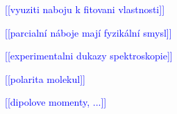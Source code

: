 \documentclass[10pt,draft,oneside]{fithesis2}
\newcommand\todo[1]{\textcolor{blue}{[[#1]]}}
\begin{document}






\todo{vyuziti naboju k fitovani vlastnosti}




\todo{parcialní náboje mají fyzikální smysl}

\todo{experimentalni dukazy spektroskopie}

\todo{polarita molekul}



\todo{dipolove momenty, ...}





\end{document}
